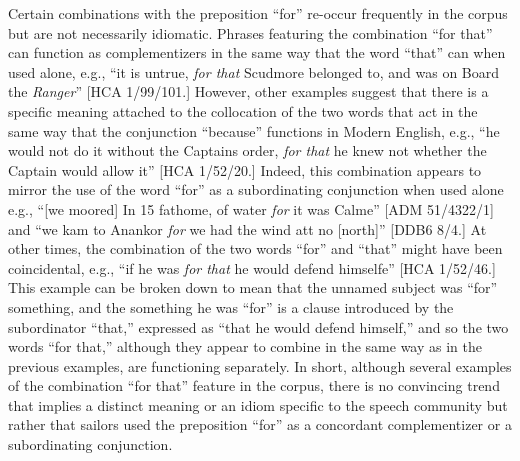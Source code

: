   Certain combinations with the preposition “for” re-occur frequently in the corpus but are not necessarily idiomatic. Phrases featuring the combination “for that” can function as complementizers in the same way that the word “that” can when used alone, e.g., “it is untrue, \textit{for that} Scudmore belonged to, and was on Board the \textit{Ranger}” [HCA 1/99/101.] However, other examples suggest that there is a specific meaning attached to the collocation of the two words that act in the same way that the conjunction “because” functions in Modern English, e.g., “he would not do it without the Captains order, \textit{for that} he knew not whether the Captain would allow it” [HCA 1/52/20.] Indeed, this combination appears to mirror the use of the word “for” as a subordinating conjunction when used alone e.g., “[we moored] In 15 fathome, of water \textit{for} it was Calme” [ADM 51/4322/1] and “we kam to Anankor \textit{for} we had the wind att no [north]” [DDB6 8/4.] At other times, the combination of the two words “for” and “that” might have been coincidental, e.g., “if he was \textit{for that} he would defend himselfe” [HCA 1/52/46.] This example can be broken down to mean that the unnamed subject was “for” something, and the something he was “for” is a clause introduced by the subordinator “that,” expressed as “that he would defend himself,” and so the two words “for that,” although they appear to combine in the same way as in the previous examples, are functioning separately. In short, although several examples of the combination “for that” feature in the corpus, there is no convincing trend that implies a distinct meaning or an idiom specific to the speech community but rather that sailors used the preposition “for” as a concordant complementizer or a subordinating conjunction. 

